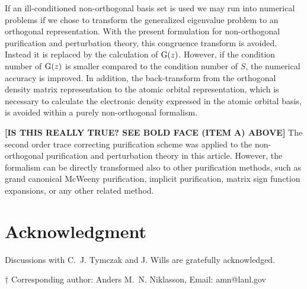\documentclass[twocolumn,showpacs,preprintnumbers,amsmath,amssymb]{revtex4}
\begin{document}
If an ill-conditioned non-orthogonal basis set is used we may run into numerical problems if we chose to
transform the generalized eigenvalue problem to an orthogonal representation. 
With the present formulation for non-orthogonal purification and perturbation theory, this congruence transform 
is avoided. Instead it is replaced by the calculation of ${\rm G}(z)$.  However, if the condition number of 
${\rm G}(z)$ is smaller compared to the condition number of $S$, the numerical accuracy is improved.
In addition, the back-transform from the orthogonal density matrix representation to the atomic orbital 
representation, which is necessary to calculate the electronic density expressed in the atomic
orbital basis, is avoided within a purely non-orthogonal formalism.

{\bf [IS THIS REALLY TRUE?  SEE BOLD FACE (ITEM A) ABOVE]}
The second order trace correcting purification scheme was applied to the
non-orthogonal purification and perturbation theory in this article. However, the formalism
can be directly transformed also to other purification methods, such as grand canonical McWeeny 
purification, implicit purification, matrix sign function expansions, or any other related method. 


\section{Acknowledgment}

Discussions with C.\ J. Tymczak and J. Wills are gratefully acknowledged.



{${\dagger}$ Corresponding author: Anders M.\ N. Niklasson, Email: amn@lanl.gov}
\end{document}
